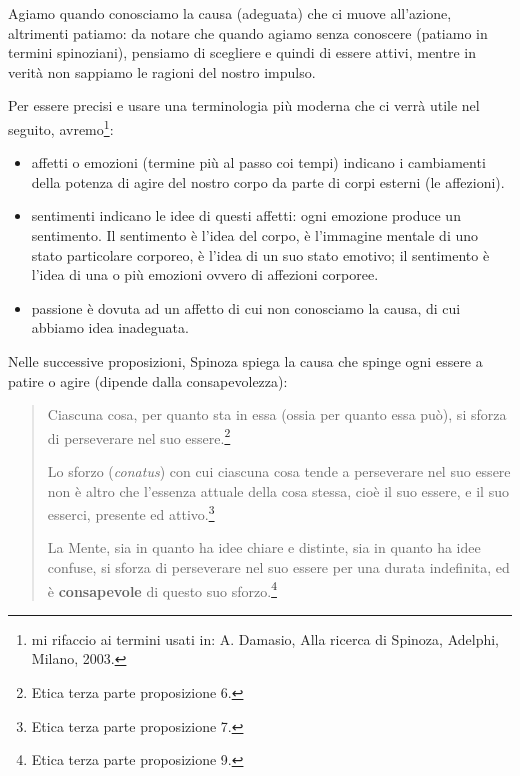 Agiamo quando conosciamo la causa (adeguata) che ci muove all'azione, altrimenti patiamo: da notare che quando agiamo senza conoscere (patiamo in termini spinoziani), pensiamo di scegliere e quindi di essere attivi, mentre in verità non sappiamo le ragioni del nostro impulso.

Per essere precisi e usare una terminologia più moderna che ci verrà utile nel seguito, avremo\footnote{mi rifaccio ai termini usati in: A. Damasio, Alla ricerca di Spinoza, Adelphi, Milano, 2003.}:

\begin{itemize}
	\item affetti o emozioni (termine più al passo coi tempi) indicano i cambiamenti della potenza di agire del nostro corpo da parte di corpi esterni (le affezioni).
	\item sentimenti indicano le idee di questi affetti: ogni emozione produce un sentimento. Il sentimento è l’idea del corpo,  è l’immagine mentale di uno stato particolare corporeo, è l’idea di un suo
	stato emotivo; il sentimento è l’idea di una o più emozioni ovvero di affezioni corporee.
	\item passione è dovuta ad un affetto di cui non conosciamo la causa, di cui abbiamo idea inadeguata.
\end{itemize}

Nelle successive proposizioni, Spinoza spiega la causa che spinge ogni essere a patire o agire (dipende dalla consapevolezza):

\begin{quotation}
	\small Ciascuna cosa, per quanto sta in essa (ossia per quanto essa può), si sforza di perseverare
	nel suo essere.\footnote{Etica terza parte proposizione 6.}
	
	Lo sforzo (\textit{conatus}) con cui ciascuna cosa tende a perseverare nel suo essere non è altro che l’essenza attuale della cosa stessa, cioè il suo essere, e il suo esserci, presente ed attivo.\footnote{Etica terza parte proposizione 7.}
	
	La Mente, sia in quanto ha idee chiare e distinte, sia in quanto ha idee confuse, si sforza
	di perseverare nel suo essere per una durata indefinita, ed è \textbf{consapevole} di questo suo sforzo.\footnote{Etica terza parte proposizione 9.}
\end{quotation}

